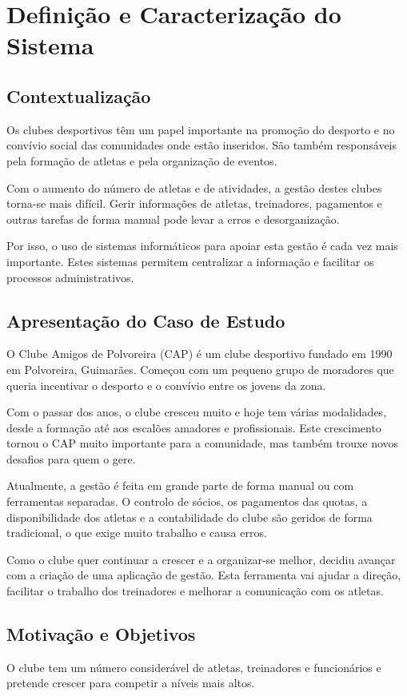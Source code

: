 \chapter{Definição e Caracterização do Sistema}

\section{Contextualização}
Os clubes desportivos têm um papel importante na promoção do desporto e no convívio social das comunidades onde estão inseridos. São também responsáveis pela formação de atletas e pela organização de eventos.

Com o aumento do número de atletas e de atividades, a gestão destes clubes torna-se mais difícil. Gerir informações de atletas, treinadores, pagamentos e outras tarefas de forma manual pode levar a erros e desorganização.

Por isso, o uso de sistemas informáticos para apoiar esta gestão é cada vez mais importante. Estes sistemas permitem centralizar a informação e facilitar os processos administrativos.
\section{Apresentação do Caso de Estudo}
O Clube Amigos de Polvoreira (CAP) é um clube desportivo fundado em 1990 em Polvoreira, Guimarães. Começou com um pequeno grupo de moradores que queria incentivar o desporto e o convívio entre os jovens da zona.

Com o passar dos anos, o clube cresceu muito e hoje tem várias modalidades, desde a formação até aos escalões amadores e profissionais. Este crescimento tornou o CAP muito importante para a comunidade, mas também trouxe novos desafios para quem o gere.

Atualmente, a gestão é feita em grande parte de forma manual ou com ferramentas separadas. O controlo de sócios, os pagamentos das quotas, a disponibilidade dos atletas e a contabilidade do clube são geridos de forma tradicional, o que exige muito trabalho e causa erros.

Como o clube quer continuar a crescer e a organizar-se melhor, decidiu avançar com a criação de uma aplicação de gestão. Esta ferramenta vai ajudar a direção, facilitar o trabalho dos treinadores e melhorar a comunicação com os atletas.

\section{Motivação e Objetivos}
O clube tem um número considerável de atletas, treinadores e funcionários e pretende crescer para competir a níveis mais altos.

